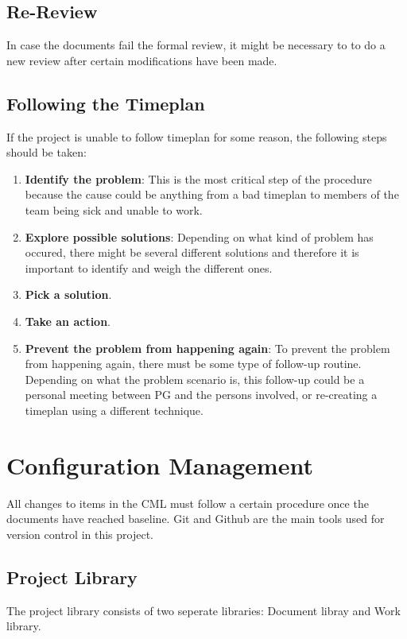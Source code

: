 \documentclass{article}
\begin{document}
    \subsection{Re-Review}
        In case the documents fail the formal review, it might be necessary to
        to do a new review after certain modifications have been made.
            
    \subsection{Following the Timeplan}
        If the project is unable to follow timeplan for some reason, the following steps should be taken:
        \begin{enumerate}
            \item \textbf{Identify the problem}: This is the most critical step of the            procedure because the cause could be anything from a bad timeplan to
                    members of the team being sick and unable to work.
            \item \textbf{Explore possible solutions}: Depending on what kind of problem has occured, there might be several different solutions and therefore it is important to identify and weigh the different ones.
            \item \textbf{Pick a solution}. 
            \item \textbf{Take an action}. 
            \item \textbf{Prevent the problem from happening again}:
                    To prevent the problem from happening again, there must be some
                    type of follow-up routine. Depending on what the problem scenario is,
                    this follow-up could be a personal meeting between PG and the persons
                    involved, or re-creating a timeplan using a different technique.
        \end{enumerate}

\section{Configuration Management}   %
    All changes to items in the CML must follow a certain procedure once the documents
    have reached baseline. Git and Github are the main tools used for version control in this project.

    \subsection{Project Library \label{project_library}}
        The project library consists of two seperate libraries: Document libray and Work library.
    
\end{document}

